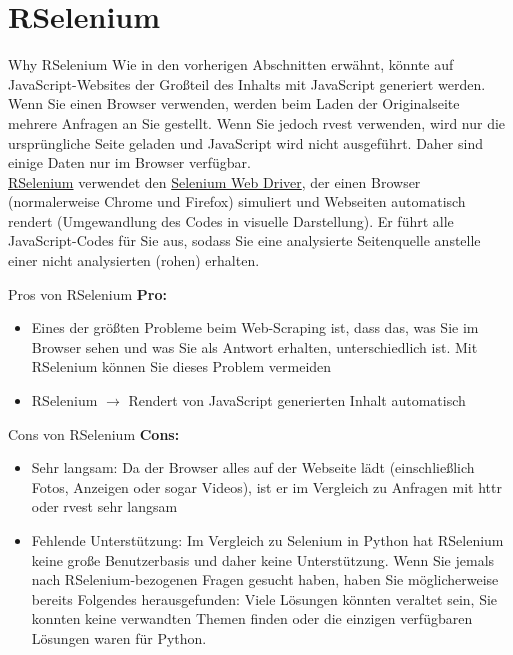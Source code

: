 \documentclass[xcolor=dvipsnames]{beamer}\usepackage[]{graphicx}\usepackage[]{color}
\begin{document}

\section{RSelenium} %

\begin{frame}{Why RSelenium}
Wie in den vorherigen Abschnitten erwähnt, könnte auf JavaScript-Websites der Großteil des Inhalts mit JavaScript generiert werden. Wenn Sie einen Browser verwenden, werden beim Laden der Originalseite mehrere Anfragen an Sie gestellt. Wenn Sie jedoch rvest verwenden, wird nur die ursprüngliche Seite geladen und JavaScript wird nicht ausgeführt. Daher sind einige Daten nur im Browser verfügbar.
\\
\href{https://github.com/ropensci/RSelenium}{RSelenium} verwendet den \href{https://www.selenium.dev/projects/}{Selenium Web Driver}, der einen Browser (normalerweise Chrome und Firefox) simuliert und Webseiten automatisch rendert (Umgewandlung des Codes in visuelle Darstellung). Er führt alle JavaScript-Codes für Sie aus, sodass Sie eine analysierte Seitenquelle anstelle einer nicht analysierten (rohen) erhalten.
\end{frame}


\begin{frame}{Pros von RSelenium}
  \textbf{Pro:}
  \begin{itemize}
    \item Eines der größten Probleme beim Web-Scraping ist, dass das, was Sie im Browser sehen und was Sie als Antwort erhalten, unterschiedlich ist. Mit RSelenium können Sie dieses Problem vermeiden
    \item RSelenium $\rightarrow$ Rendert von JavaScript generierten Inhalt automatisch
  \end{itemize}
\end{frame}


\begin{frame}{Cons von RSelenium}
  \textbf{Cons:}
  \begin{itemize}
    \item Sehr langsam: Da der Browser alles auf der Webseite lädt (einschließlich Fotos, Anzeigen oder sogar Videos), ist er im Vergleich zu Anfragen mit httr oder rvest sehr langsam
    \item Fehlende Unterstützung: Im Vergleich zu Selenium in Python hat RSelenium keine große Benutzerbasis und daher keine Unterstützung. Wenn Sie jemals nach RSelenium-bezogenen Fragen gesucht haben, haben Sie möglicherweise bereits Folgendes herausgefunden: Viele Lösungen könnten veraltet sein, Sie konnten keine verwandten Themen finden oder die einzigen verfügbaren Lösungen waren für Python.
  \end{itemize}
\end{frame}
\end{document}
